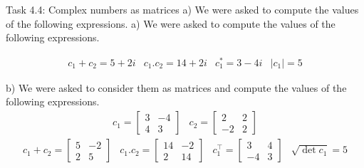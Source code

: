 \documentclass[aspectratio=169]{beamer}
\begin{document}
\begin{frame}[fragile]{Task 4.4: Complex numbers as matrices}
a) We were asked to compute the values of the following expressions.
a) We were asked to compute the values of the following expressions.

\[
\begin{array}{llll}
c_1 + c_2 = 5+2i & c_1 . c_2 = 14+2i &
c_1^* = 3-4i & |c_1| = 5
\end{array}
\]

b) We were asked to consider them as matrices and compute the values of the following expressions.
\[
\begin{array}{ll}
c_1 = \begin{bmatrix}3 & -4 \\ 4 & 3\end{bmatrix} & c_2 = \begin{bmatrix}2 & 2 \\ -2 & 2\end{bmatrix}
\end{array}
\]
\[
\begin{array}{llll}
c_1 + c_2 = \begin{bmatrix}5 & -2 \\ 2 & 5\end{bmatrix} & c_1 . c_2 = \begin{bmatrix}14 & -2 \\ 2 & 14\end{bmatrix} &
c_1^\top = \begin{bmatrix}3 & 4 \\ -4 & 3\end{bmatrix} & \sqrt{\det c_1} = 5
\end{array}
\]
\end{frame}

\end{document}
